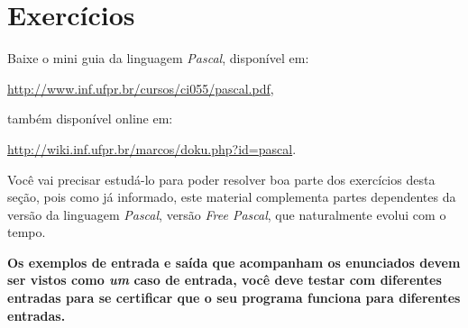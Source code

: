 \section{Exercícios}

Baixe o mini guia da linguagem \emph{Pascal}, disponível em:

\begin{center}
\url{http://www.inf.ufpr.br/cursos/ci055/pascal.pdf},
\end{center}

\noindent também disponível online em:

\begin{center}
\url{http://wiki.inf.ufpr.br/marcos/doku.php?id=pascal}.
\end{center}

Você vai precisar estudá-lo para poder resolver boa parte dos
exercícios desta seção, pois como já informado, este material complementa
partes dependentes da versão da linguagem \emph{Pascal}, versão \emph{Free
Pascal}, que naturalmente evolui com o tempo. 

\vspace*{\baselineskip}

\noindent
\textbf{Os exemplos de entrada e saída que acompanham os enunciados
devem ser vistos como \emph{um} caso de entrada, você deve testar
com diferentes entradas para se certificar que o seu programa funciona
para diferentes entradas.}

